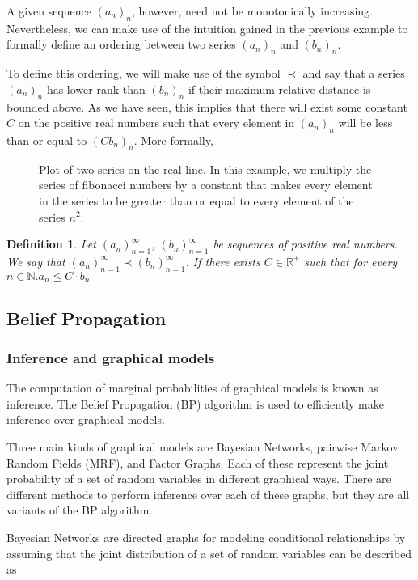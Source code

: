 \documentclass[11pt]{article}
\newtheorem{definition}{Definition}
\begin{document}
A given sequence $(a_n)_n$, however, need not be monotonically increasing. Nevertheless, we can make use of the intuition gained in the previous example to formally define an ordering between two series $(a_n)_n$ and $(b_n)_n$.

To define this ordering, we will make use of the symbol $\prec$ and say that a series $(a_n)_n$ has lower rank than $(b_n)_n$ if their maximum relative distance is bounded above. As we have seen, this implies that there will exist some constant $C$ on the positive real numbers such that every element in $(a_n)_n$ will be less than or equal to $(C b_n)_n$. More formally,


\begin{figure*}[h!]
	\centering
	\scalebox{0.5}{}
	\caption{Plot of two series on the real line. In this example, we multiply the series of fibonacci numbers by a constant that makes every element in the series to be greater than or equal to every element of the series $n^2$.}
	\label{fig:growth-2}
\end{figure*}


\begin{definition}
	Let $(a_n)_{n=1}^\infty$, $(b_n)_{n=1}^\infty$ be sequences of positive real numbers. We say that $(a_n)_{n=1}^\infty \prec (b_n)_{n=1}^\infty$. If there exists $C\in\mathbb{R}^{+}$ such that for every $n\in\mathbb{N}. a_n \leq C\cdot b_n$
\end{definition}

\subsection*{Belief Propagation}
\subsubsection*{Inference and graphical models}
The computation of marginal probabilities of graphical models is known as inference. The Belief Propagation (BP) algorithm is used to efficiently make inference over graphical models.

Three main kinds of graphical models are Bayesian Networks, pairwise Markov Random Fields (MRF), and Factor Graphs. Each of these represent the joint probability of a set of random variables in different graphical ways. There are different methods to perform inference over each of these graphs, but they are all variants of the BP algorithm.


Bayesian Networks are directed graphs for modeling conditional relationships by assuming that the joint distribution of a set of random variables can be described as
\end{document}
